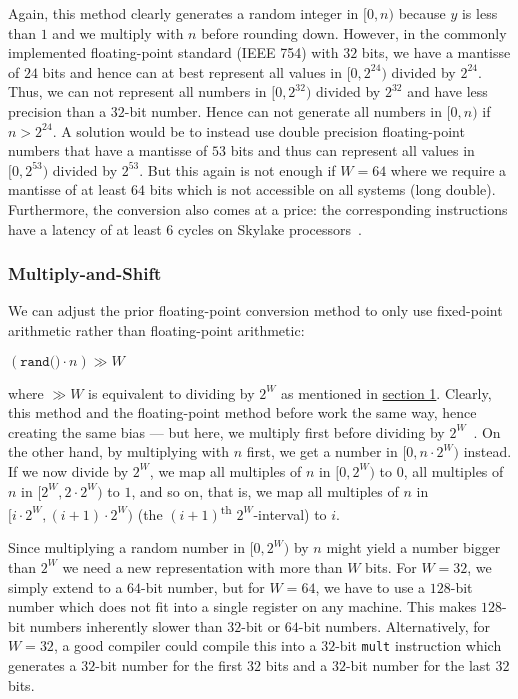 \documentclass[a4paper, UKenglish, cleveref, autoref, thm-restate]{lipics-v2021}
\begin{document}
Again, this method clearly generates a random integer in $[0,n)$ because $y$ is less than $1$ and we multiply with $n$ before rounding down.
However, in the commonly implemented floating-point standard (IEEE 754) with $32$ bits, we have a mantisse of $24$ bits and hence can at best represent all values in $[0,2^{24})$ divided by $2^{24}$.
Thus, we can not represent all numbers in $[0,2^{32})$ divided by $2^{32}$ and have less precision than a $32$-bit number.
Hence can not generate all numbers in $[0,n)$ if $n > 2^{24}$.
A solution would be to instead use double precision floating-point numbers that have a mantisse of $53$ bits and thus can represent all values in $[0,2^{53})$ divided by $2^{53}$.
But this again is not enough if $W = 64$ where we require a mantisse of at least $64$ bits which is not accessible on all systems (long double).
Furthermore, the conversion also comes at a price: the corresponding instructions have a latency of at least $6$ cycles on Skylake processors~\cite{Instructions}.


\subsubsection{Multiply-and-Shift}\label{sec:2.1.3}
We can adjust the prior floating-point conversion method to only use fixed-point arithmetic rather than floating-point arithmetic:
\begin{center}
    $\left(\texttt{rand()} \cdot n\right) \gg W$
\end{center}
where $\gg W$ is equivalent to dividing by $2^W$ as mentioned in \hyperref[sec:1.2]{section 1}.
Clearly, this method and the floating-point method before work the same way, hence creating the same bias --- but here, we multiply first before dividing by $2^W$~\cite{MultShift}.
On the other hand, by multiplying with $n$ first, we get a number in $[0,n \cdot 2^W)$ instead.
If we now divide by $2^W$, we map all multiples of $n$ in $[0,2^W)$ to $0$, all multiples of $n$ in $[2^W, 2 \cdot 2^W)$ to $1$, and so on, that is, we map all multiples of $n$ in $[i \cdot 2^W, (i + 1) \cdot 2^W)$ (the $(i + 1)$\textsuperscript{th} $2^W$-interval) to $i$.

Since multiplying a random number in $[0,2^W)$ by $n$ might yield a number bigger than $2^W$ we need a new representation with more than $W$ bits.
For $W = 32$, we simply extend to a $64$-bit number, but for $W = 64$, we have to use a $128$-bit number which does not fit into a single register on any machine. 
This makes $128$-bit numbers inherently slower than $32$-bit or $64$-bit numbers.
Alternatively, for $W = 32$, a good compiler could compile this into a $32$-bit \texttt{mult} instruction which generates a $32$-bit number for the first $32$ bits and a $32$-bit number for the last $32$ bits.
\end{document}
